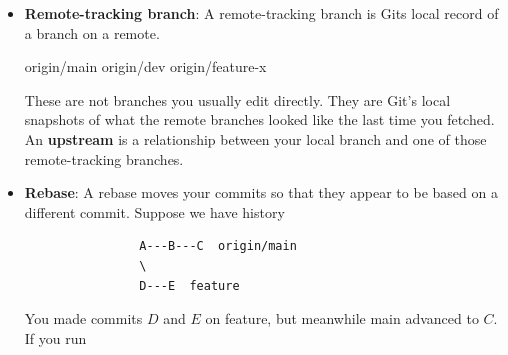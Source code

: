 \documentclass{report}
\begin{document}
\begin{itemize}
\begin{bashcode}
                git switch -c feature
            \end{bashcode}
            \bigbreak \noindent 
            At this point, feature is just local. It does not automatically have an upstream unless you created it from a remote branch in a tracking-aware way.
            \bigbreak \noindent 
            If you only want to work locally, no upstream is needed.
            \bigbreak \noindent 
            But if you want to push it, you usually do
            \bigbreak \noindent 
            \begin{bashcode}
                git push -u origin feature 
            \end{bashcode}
            \bigbreak \noindent 
            This does two things
            \begin{enumerate}
                \item Creates / updates the remote branch
                    \bigbreak \noindent 
                    \begin{bashcode}
                        origin/feature
                    \end{bashcode}
                \item Sets your local branch \textbf{feature} to track \textbf{origin/feature}.
            \end{enumerate}
        \item \textbf{Remote-tracking branch}: A remote-tracking branch is Gits local record of a branch on a remote.
            \bigbreak \noindent 
            \begin{bashcode}
                origin/main
                origin/dev
                origin/feature-x
            \end{bashcode}
            \bigbreak \noindent 
            These are not branches you usually edit directly. They are Git’s local snapshots of what the remote branches looked like the last time you fetched.
            \bigbreak \noindent 
            An \textbf{upstream} is a relationship between your local branch and one of those remote-tracking branches.
        \item \textbf{Rebase}: A rebase moves your commits so that they appear to be based on a different commit. Suppose we have history
            \begin{verbatim}
                A---B---C  origin/main
                \
                D---E  feature
            \end{verbatim}
            \bigbreak \noindent 
            You made commits $D$ and $E$ on feature, but meanwhile main advanced to $C$. If you run

\end{itemize}
\end{document}
